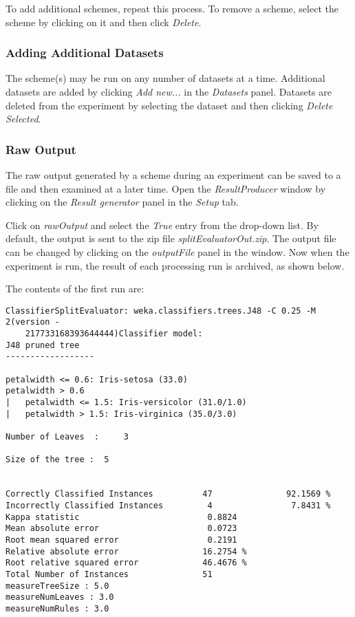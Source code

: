 \documentclass[a4paper]{article}
\begin{document}
To add additional schemes, repeat this process. To remove a scheme, select the scheme by clicking on it and then click \textit{Delete}.


\subsubsection*{Adding Additional Datasets}

The scheme(s) may be run on any number of datasets at a time. Additional datasets are added by clicking \textit{Add new...} in the \textit{Datasets} panel. Datasets are deleted from the experiment by selecting the dataset and then clicking \textit{Delete Selected}.


\subsubsection*{Raw Output}

The raw output generated by a scheme during an experiment can be saved to a file and then examined at a later time. Open the \textit{ResultProducer} window by clicking on the \textit{Result generator} panel in the \textit{Setup} tab.
\begin{center}
\end{center}

Click on \textit{rawOutput} and select the \textit{True} entry from the drop-down list. By default, the output is sent to the zip file \textit{splitEvaluatorOut.zip}. The output file can be changed by clicking on the \textit{outputFile} panel in the window. Now when the experiment is run, the result of each processing run is archived, as shown below.
\begin{center}
\end{center}

The contents of the first run are:

\begin{verbatim}
ClassifierSplitEvaluator: weka.classifiers.trees.J48 -C 0.25 -M 2(version -
    217733168393644444)Classifier model: 
J48 pruned tree
------------------

petalwidth <= 0.6: Iris-setosa (33.0)
petalwidth > 0.6
|   petalwidth <= 1.5: Iris-versicolor (31.0/1.0)
|   petalwidth > 1.5: Iris-virginica (35.0/3.0)

Number of Leaves  : 	3

Size of the tree : 	5


Correctly Classified Instances          47               92.1569 %
Incorrectly Classified Instances         4                7.8431 %
Kappa statistic                          0.8824
Mean absolute error                      0.0723
Root mean squared error                  0.2191
Relative absolute error                 16.2754 %
Root relative squared error             46.4676 %
Total Number of Instances               51     
measureTreeSize : 5.0
measureNumLeaves : 3.0
measureNumRules : 3.0
\end{verbatim}
\end{document}

